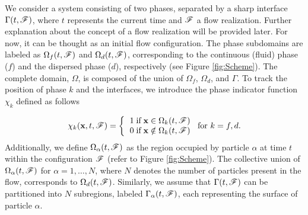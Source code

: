 We consider a system consisting of two phases, separated by a sharp interface $\Gamma(t,\mathscr{F})$,
where $t$ represents the current time and $\mathscr{F}$ a flow realization. %
Further explanation about the concept of a flow realization will be provided later. For now, it can be thought as an initial flow configuration. %
The phase subdomains are labeled as $\Omega_f(t,\mathscr{F})$ and $\Omega_d(t,\mathscr{F})$, corresponding to the continuous (fluid) phase ($f$) and the dispersed phase ($d$), respectively (see Figure \ref{fig:Scheme}). The complete domain, $\Omega$, is composed of the union of $\Omega_f$, $\Omega_d$, and $\Gamma$. To track the position of phase $k$ and the interfaces, we introduce the phase indicator function $\chi_k$ defined as follows

\begin{align}
    \chi_k(\textbf{x},t,\FF) =  \left\{
      \begin{tabular}{cc}
        $1 \;\text{if} \;\textbf{x} \in \Omega_k(t,\FF)$\\
        $0 \;\text{if} \;\textbf{x} \notin \Omega_k(t,\FF)$
      \end{tabular}
      \right.
      \text{for $k = f,d$}.
      \label{eq:PIF}
\end{align}
Additionally, we define $\Omega_\alpha(t, \mathscr{F})$ as the region occupied by particle $\alpha$ at time $t$ within the configuration $\mathscr{F}$ (refer to Figure \ref{fig:Scheme}). The collective union of $\Omega_\alpha(t, \mathscr{F})$ for $\alpha = 1, \ldots, N$, where $N$ denotes the number of particles present in the flow, corresponds to $\Omega_d(t, \mathscr{F})$. Similarly, we assume that $\Gamma(t, \mathscr{F})$ can be partitioned into $N$ subregions, labeled $\Gamma_\alpha(t, \mathscr{F})$, each representing the surface of particle $\alpha$.

